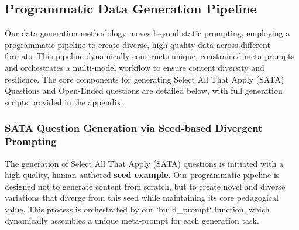 \documentclass[letterpaper]{article} %
\begin{document}
\subsection{Programmatic Data Generation Pipeline}
\label{sec:data_generation_pipeline}

Our data generation methodology moves beyond static prompting, employing a programmatic pipeline to create diverse, high-quality data across different formats. This pipeline dynamically constructs unique, constrained meta-prompts and orchestrates a multi-model workflow to ensure content diversity and resilience. The core components for generating Select All That Apply (SATA) Questions and Open-Ended questions are detailed below, with full generation scripts provided in the appendix.


\subsubsection{SATA Question Generation via Seed-based Divergent Prompting}
\label{sec:SATA_generation}

The generation of Select All That Apply (SATA) questions is initiated with a high-quality, human-authored \textbf{seed example}. Our programmatic pipeline is designed not to generate content from scratch, but to create novel and diverse variations that diverge from this seed while maintaining its core pedagogical value. This process is orchestrated by our `build\_prompt` function, which dynamically assembles a unique meta-prompt for each generation task.
\end{document}
